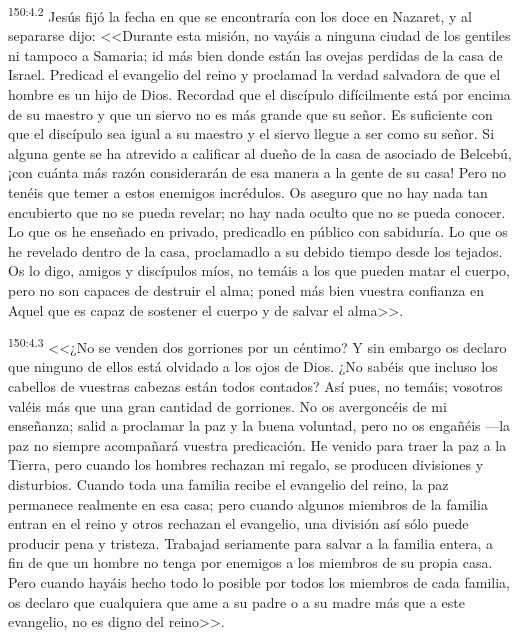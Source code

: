 \par 
\textsuperscript{150:4.2} Jesús fijó la fecha en que se encontraría con los doce en Nazaret, y al separarse dijo: <<Durante esta misión, no vayáis a ninguna ciudad de los gentiles ni tampoco a Samaria; id más bien donde están las ovejas perdidas de la casa de Israel. Predicad el evangelio del reino y proclamad la verdad salvadora de que el hombre es un hijo de Dios. Recordad que el discípulo difícilmente está por encima de su maestro y que un siervo no es más grande que su señor. Es suficiente con que el discípulo sea igual a su maestro y el siervo llegue a ser como su señor. Si alguna gente se ha atrevido a calificar al dueño de la casa de asociado de Belcebú, ¡con cuánta más razón considerarán de esa manera a la gente de su casa! Pero no tenéis que temer a estos enemigos incrédulos. Os aseguro que no hay nada tan encubierto que no se pueda revelar; no hay nada oculto que no se pueda conocer. Lo que os he enseñado en privado, predicadlo en público con sabiduría. Lo que os he revelado dentro de la casa, proclamadlo a su debido tiempo desde los tejados. Os lo digo, amigos y discípulos míos, no temáis a los que pueden matar el cuerpo, pero no son capaces de destruir el alma; poned más bien vuestra confianza en Aquel que es capaz de sostener el cuerpo y de salvar el alma>>.

\par 
\textsuperscript{150:4.3} <<¿No se venden dos gorriones por un céntimo? Y sin embargo os declaro que ninguno de ellos está olvidado a los ojos de Dios. ¿No sabéis que incluso los cabellos de vuestras cabezas están todos contados? Así pues, no temáis; vosotros valéis más que una gran cantidad de gorriones. No os avergoncéis de mi enseñanza; salid a proclamar la paz y la buena voluntad, pero no os engañéis ---la paz no siempre acompañará vuestra predicación. He venido para traer la paz a la Tierra, pero cuando los hombres rechazan mi regalo, se producen divisiones y disturbios. Cuando toda una familia recibe el evangelio del reino, la paz permanece realmente en esa casa; pero cuando algunos miembros de la familia entran en el reino y otros rechazan el evangelio, una división así sólo puede producir pena y tristeza. Trabajad seriamente para salvar a la familia entera, a fin de que un hombre no tenga por enemigos a los miembros de su propia casa. Pero cuando hayáis hecho todo lo posible por todos los miembros de cada familia, os declaro que cualquiera que ame a su padre o a su madre más que a este evangelio, no es digno del reino>>.

